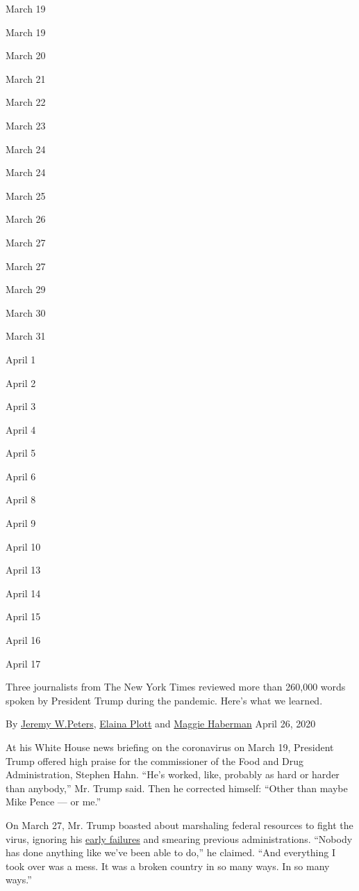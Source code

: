 March 19

March 19

March 20

March 21

March 22

March 23

March 24

March 24

March 25

March 26

March 27

March 27

March 29

March 30

March 31

April 1

April 2

April 3

April 4

April 5

April 6

April 8

April 9

April 10

April 13

April 14

April 15

April 16

April 17

Three journalists from The New York Times reviewed more than 260,000
words spoken by President Trump during the pandemic. Here's what we
learned.

 By \href{https://www.nytimes.com/by/jeremy-w-peters}{Jeremy
W}\href{https://www.nytimes.com/by/jeremy-w-peters}{.}\href{https://www.nytimes.com/by/jeremy-w-peters}{Peters},
\href{https://www.nytimes.com/by/elaina-plott}{Elaina Plott} and
\href{https://www.nytimes.com/by/maggie-haberman}{Maggie Haberman} April
26, 2020

At his White House news briefing on the coronavirus on March 19,
President Trump offered high praise for the commissioner of the Food and
Drug Administration, Stephen Hahn. ``He's worked, like, probably as hard
or harder than anybody,'' Mr. Trump said. Then he corrected himself:
``Other than maybe Mike Pence --- or me.''

On March 27, Mr. Trump boasted about marshaling federal resources to
fight the virus, ignoring his
\href{https://www.nytimes.com/2020/04/11/us/politics/coronavirus-trump-response.html}{early
failures} and smearing previous administrations. ``Nobody has done
anything like we've been able to do,'' he claimed. ``And everything I
took over was a mess. It was a broken country in so many ways. In so
many ways.''

